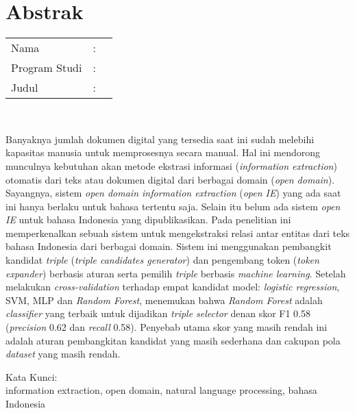 %
%
%

\chapter*{Abstrak}

\vspace*{0.2cm}

\noindent \begin{tabular}{l l p{10cm}}
	Nama&: & \penulis \\
	Program Studi&: & \program \\
	Judul&: & \judul \\
\end{tabular} \\ 

\vspace*{0.5cm}

\noindent Banyaknya jumlah dokumen digital yang tersedia saat ini sudah melebihi kapasitas manusia untuk memprosesnya secara manual. Hal ini mendorong munculnya kebutuhan akan metode ekstrasi informasi (\textit{information extraction}) otomatis dari teks atau dokumen digital dari berbagai domain (\textit{open domain}). Sayangnya, sistem \textit{open domain information extraction} (\textit{open IE}) yang ada saat ini hanya berlaku untuk bahasa tertentu saja. Selain itu belum ada sistem \textit{open IE} untuk bahasa Indonesia yang dipublikasikan. Pada penelitian ini \saya memperkenalkan sebuah sistem untuk mengekstraksi relasi antar entitas dari teks bahasa Indonesia dari berbagai domain. Sistem ini menggunakan pembangkit kandidat \textit{triple} (\textit{triple candidates generator}) dan pengembang token (\textit{token expander}) berbasis aturan serta pemilih \textit{triple} berbasis \textit{machine learning}. Setelah melakukan \textit{cross-validation} terhadap empat kandidat model: \textit{logistic regression}, SVM, MLP dan \textit{Random Forest}, \saya menemukan bahwa \textit{Random Forest} adalah \textit{classifier} yang terbaik untuk dijadikan \textit{triple selector} denan skor F1 0.58 (\textit{precision} 0.62 dan \textit{recall} 0.58). Penyebab utama skor yang masih rendah ini adalah aturan pembangkitan kandidat yang masih sederhana dan cakupan pola \textit{dataset} yang masih rendah. \\

\vspace*{0.2cm}

\noindent Kata Kunci: \\ 
\noindent information extraction, open domain, natural language processing, bahasa Indonesia \\

\newpage